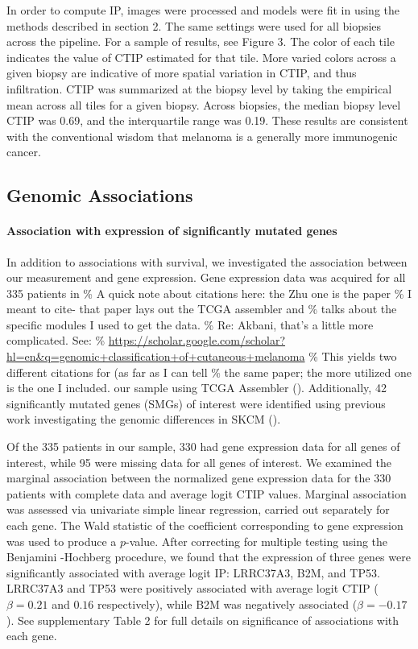 \documentclass[
]{book}
\begin{document}
In order to compute IP,
images were processed and models were fit in using the methods
described in section 2. The same settings were used for all
biopsies across the pipeline. For a sample of results, see Figure 3. The color of each tile indicates the value of CTIP estimated for that tile. More varied colors across a given biopsy are indicative of more spatial variation in CTIP, and thus infiltration. CTIP was summarized at the biopsy level by taking the empirical mean across all tiles for a given biopsy. Across biopsies, the median biopsy level CTIP was 0.69, and the interquartile range was 0.19. These results are consistent with the conventional wisdom that melanoma is a generally more immunogenic cancer.

\hypertarget{genomic-associations}{%
\subsection{Genomic Associations}\label{genomic-associations}}

\paragraph{\textbf{Association with expression of significantly mutated genes}}

In addition to associations with survival, we investigated the
association between our measurement and gene expression. Gene
expression data was acquired for all 335 patients in
\% A quick note about citations here: the Zhu one is the paper
\% I meant to cite- that paper lays out the TCGA assembler and
\% talks about the specific modules I used to get the data.
\% Re: Akbani, that's a little more complicated. See:
\% \url{https://scholar.google.com/scholar?hl=en\&q=genomic+classification+of+cutaneous+melanoma}
\% This yields two different citations for (as far as I can tell
\% the same paper; the more utilized one is the one I included.
our sample using TCGA Assembler (\citet{Zhu14}). Additionally,
42 significantly mutated genes (SMGs) of interest were identified
using previous work investigating the genomic differences in
SKCM (\citet{Akbani15}).

Of the 335 patients in our sample, 330 had gene expression data
for all genes of interest, while 95 were missing data for all
genes of interest. We examined the marginal association between
the normalized gene expression data for the 330 patients with
complete data and average logit CTIP values. Marginal association
was assessed via univariate simple linear regression, carried out
separately for each gene. The Wald statistic of the coefficient
corresponding to gene expression was used to produce a \(p\)-value.
After correcting for multiple testing using the Benjamini
-Hochberg procedure, we found that the expression of three genes
were significantly associated with average logit IP: LRRC37A3,
B2M, and TP53. LRRC37A3 and TP53 were positively associated with
average logit CTIP (\(\beta = 0.21\) and \(0.16\) respectively), while
B2M was negatively associated (\(\beta = -0.17\)).
See supplementary Table 2 for full details on
significance of associations with each gene.
\end{document}
